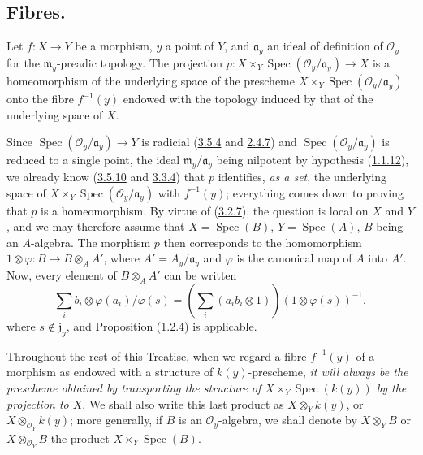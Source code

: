 \subsection{Fibres.}
\label{subsection:I.3.6}

\begin{proposition}[3.6.1]
\label{I.3.6.1}
Let $f:X\to Y$ be a morphism, $y$ a point of $Y$, and $\mathfrak{a}_y$ an
ideal of definition of $\mathcal{O}_y$ for the
$\mathfrak{m}_y$-preadic topology. The projection
$p:X\times_Y\operatorname{Spec}(\mathcal{O}_y/\mathfrak{a}_y)\to X$ is a
homeomorphism of the underlying space of the prescheme
$X\times_Y\operatorname{Spec}(\mathcal{O}_y/\mathfrak{a}_y)$ onto the fibre
$f^{-1}(y)$ endowed with the topology induced by that of the underlying space
of $X$.
\end{proposition}

Since $\operatorname{Spec}(\mathcal{O}_y/\mathfrak{a}_y)\to Y$ is radicial
(\hyperref[I.3.5.4]{3.5.4} and \hyperref[I.2.4.7]{2.4.7}) and
$\operatorname{Spec}(\mathcal{O}_y/\mathfrak{a}_y)$ is reduced to a single
point, the ideal $\mathfrak{m}_y/\mathfrak{a}_y$ being nilpotent by hypothesis
(\hyperref[I.1.1.12]{1.1.12}), we already know
(\hyperref[I.3.5.10]{3.5.10} and \hyperref[I.3.3.4]{3.3.4}) that $p$
identifies, \emph{as a set}, the underlying space of
$X\times_Y\operatorname{Spec}(\mathcal{O}_y/\mathfrak{a}_y)$ with $f^{-1}(y)$;
everything comes down to proving that $p$ is a homeomorphism. By virtue of
(\hyperref[I.3.2.7]{3.2.7}), the question is local on $X$ and $Y$, and we
may therefore assume that $X=\operatorname{Spec}(B)$,
$Y=\operatorname{Spec}(A)$, $B$ being an $A$-algebra. The morphism $p$
then corresponds to the homomorphism
$1\otimes\varphi:B\to B\otimes_A A'$, where $A'=A_y/\mathfrak{a}_y$ and
$\varphi$ is the canonical map of $A$ into $A'$. Now, every element of
$B\otimes_A A'$ can be written
\label{I.3.6.1.localization-fraction}
\[
  \sum_i b_i\otimes\varphi(a_i)/\varphi(s)
  =\left(\sum_i(a_i b_i\otimes 1)\right)(1\otimes\varphi(s))^{-1},
\]
where $s\notin\mathfrak{j}_y$, and Proposition
(\hyperref[I.1.2.4]{1.2.4}) is applicable.

\begin{env}[3.6.2]
\label{I.3.6.2}
Throughout the rest of this Treatise, when we regard a fibre
$f^{-1}(y)$ of a morphism as endowed with a structure of $k(y)$-prescheme,
\emph{it will always be the prescheme obtained by transporting the structure
of $X\times_Y\operatorname{Spec}(k(y))$ by the projection to $X$}. We
shall also write this last product as $X\otimes_Y k(y)$, or
$X\otimes_{\mathcal{O}_Y}k(y)$; more generally, if $B$ is an
$\mathcal{O}_y$-algebra, we shall denote by $X\otimes_Y B$ or
$X\otimes_{\mathcal{O}_Y}B$ the product
$X\times_Y\operatorname{Spec}(B)$.
\end{env}

